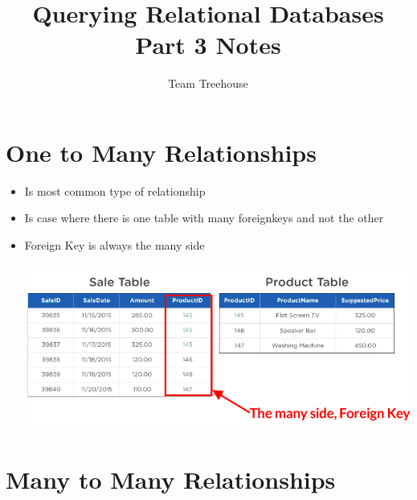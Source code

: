 \documentclass[12pt]{article}
\begin{document}
\title{Querying Relational Databases Part 3 Notes}
\author{Team Treehouse}
\maketitle

\bigskip

\section{One to Many Relationships}

\bigskip

\begin{itemize}
    \item Is most common type of relationship
    \item Is case where there is one table with many foreignkeys and not the other
    \item Foreign Key is always the many side

    \begin{center}
    \includegraphics[width=0.8\linewidth]{images/part_3_notes_1.png}
    \end{center}
\end{itemize}

\bigskip

\section{Many to Many Relationships}

\bigskip
\end{document}
